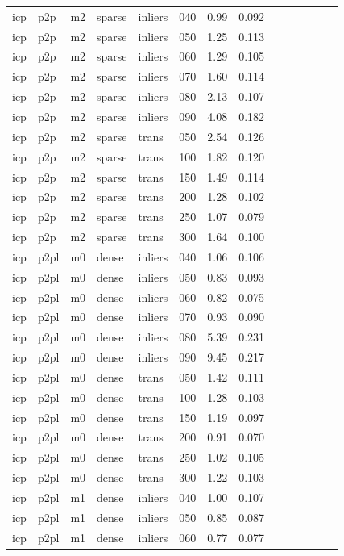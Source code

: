 \begin{table}[htbp]
\begin{tabular}{llllllrrrrrrrr}
  icp & p2p & m2 & sparse & inliers & 040 & 0.99 & 0.092 \\
  icp & p2p & m2 & sparse & inliers & 050 & 1.25 & 0.113 \\
  icp & p2p & m2 & sparse & inliers & 060 & 1.29 & 0.105 \\
  icp & p2p & m2 & sparse & inliers & 070 & 1.60 & 0.114 \\
  icp & p2p & m2 & sparse & inliers & 080 & 2.13 & 0.107 \\
  icp & p2p & m2 & sparse & inliers & 090 & 4.08 & 0.182 \\
  icp & p2p & m2 & sparse & trans & 050 & 2.54 & 0.126 \\
  icp & p2p & m2 & sparse & trans & 100 & 1.82 & 0.120 \\
  icp & p2p & m2 & sparse & trans & 150 & 1.49 & 0.114 \\
  icp & p2p & m2 & sparse & trans & 200 & 1.28 & 0.102 \\
  icp & p2p & m2 & sparse & trans & 250 & 1.07 & 0.079 \\
  icp & p2p & m2 & sparse & trans & 300 & 1.64 & 0.100 \\
  icp & p2pl & m0 & dense & inliers & 040 & 1.06 & 0.106 \\
  icp & p2pl & m0 & dense & inliers & 050 & 0.83 & 0.093 \\
  icp & p2pl & m0 & dense & inliers & 060 & 0.82 & 0.075 \\
  icp & p2pl & m0 & dense & inliers & 070 & 0.93 & 0.090 \\
  icp & p2pl & m0 & dense & inliers & 080 & 5.39 & 0.231 \\
  icp & p2pl & m0 & dense & inliers & 090 & 9.45 & 0.217 \\
  icp & p2pl & m0 & dense & trans & 050 & 1.42 & 0.111 \\
  icp & p2pl & m0 & dense & trans & 100 & 1.28 & 0.103 \\
  icp & p2pl & m0 & dense & trans & 150 & 1.19 & 0.097 \\
  icp & p2pl & m0 & dense & trans & 200 & 0.91 & 0.070 \\
  icp & p2pl & m0 & dense & trans & 250 & 1.02 & 0.105 \\
  icp & p2pl & m0 & dense & trans & 300 & 1.22 & 0.103 \\
  icp & p2pl & m1 & dense & inliers & 040 & 1.00 & 0.107 \\
  icp & p2pl & m1 & dense & inliers & 050 & 0.85 & 0.087 \\
  icp & p2pl & m1 & dense & inliers & 060 & 0.77 & 0.077 \\

\end{tabular}
\end{table}
